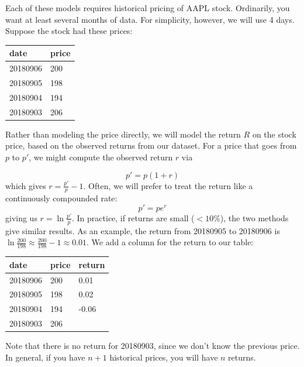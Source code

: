 \documentclass{report}
\numberwithin{problem}{chapter} %
\begin{document}
Each of these models requires historical pricing of AAPL stock. Ordinarily, you want at least several months of data. For simplicity, however, we will use 4 days. Suppose the stock had these prices:

\begin{center}
\begin{tabular}{lr}
\textbf{date}                  & \textbf{price}                    \\ \hline
\multicolumn{1}{|l|}{20180906} & \multicolumn{1}{l|}{200}   \\ \hline
\multicolumn{1}{|l|}{20180905} & \multicolumn{1}{l|}{198}   \\ \hline
\multicolumn{1}{|l|}{20180904} & \multicolumn{1}{l|}{194}  \\ \hline
\multicolumn{1}{|l|}{20180903} & \multicolumn{1}{l|}{206}      \\ \hline
\end{tabular}
\end{center}

Rather than modeling the price directly, we will model the return $R$ on the stock price, based on the observed returns from our dataset. For a price that goes from $p$ to $p'$, we might compute the observed return $r$ via

\begin{equation}
\label{eq:1}
p'=p(1+r)
\end{equation}
which gives $r=\frac{p'}{p}-1$. Often, we will prefer to treat the return like a continuously compounded rate:
\begin{equation}
\label{eq:2}
p'=pe^r
\end{equation}
giving us $r=\ln {\frac{p'}{p}}$. In practice, if returns are small ($< 10\%$), the two methods give similar results. As an example, the return from 20180905 to 20180906 is  $\ln{\frac{200}{198}} \approx  \frac{200}{198} - 1 \approx 0.01$. We add a column for the return to our table:

\begin{center}
\begin{tabular}{lrr}
\textbf{date}                  & \textbf{price}           & \textbf{return}            \\ \hline
\multicolumn{1}{|l|}{20180906} & \multicolumn{1}{l|}{200} & \multicolumn{1}{l|}{0.01}  \\ \hline
\multicolumn{1}{|l|}{20180905} & \multicolumn{1}{l|}{198} & \multicolumn{1}{l|}{0.02}  \\ \hline
\multicolumn{1}{|l|}{20180904} & \multicolumn{1}{l|}{194} & \multicolumn{1}{l|}{-0.06} \\ \hline
\multicolumn{1}{|l|}{20180903} & \multicolumn{1}{l|}{206} & \multicolumn{1}{l|}{}      \\ \hline
\end{tabular}
\end{center}
Note that there is no return for 20180903, since we don't know the previous price. In general, if you have $n+1$ historical prices, you will have $n$ returns.
\end{document}
